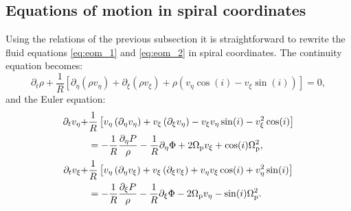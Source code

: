 \documentclass[useAMS,usenatbib]{mn2e}
\def\pa{\partial}
\begin{document}
\subsection{Equations of motion in spiral coordinates}
Using the relations of the previous subsection it is straightforward to rewrite the fluid equations \eqref{eq:eom_1} and \eqref{eq:eom_2} in spiral coordinates. The continuity equation becomes:
\begin{equation} 
	\pa_t \rho + \frac{1}{R}\left[ \pa_{\eta} \left(\rho v_{\eta}\right) + \pa_{\xi} \left(\rho v_{\xi}\right) + \rho \left(v_{\eta} \cos(i) - v_{\xi} \sin(i) \right)\right] = 0,
\label{eq:continuity}
\end{equation}
and the Euler equation:
\begin{align}
	\pa_t v_{\eta} + &\frac{1}{R} \left[ v_{\eta} \left(\pa_{\eta} v_{\eta}\right) + v_{\xi} \left(\pa_{\xi} v_{\eta}\right) - v_{\xi} v_{\eta} \sin(i) - v_{\xi}^2 \cos(i) \right] \nonumber \\
		& = - \frac{1}{R} \frac{ \pa_{\eta} P}{\rho} - \frac{1}{R} \pa_{\eta} \Phi + 2 \Omegap v_{\xi} +\cos(i) \Omegap^2, \\
	\pa_t v_{\xi}   + &\frac{1}{R} \left[ v_{\eta} \left(\pa_{\eta} v_{\xi}\right) + v_{\xi} \left(\pa_{\xi} v_{\xi}\right) + v_{\eta} v_{\xi} \cos(i) + v_{\eta}^2 \sin(i) \right] \nonumber \\ 
		& = - \frac{1}{R} \frac{ \pa_{\xi} P}{\rho} - \frac{1}{R} \pa_{\xi} \Phi - 2\Omegap v_{\eta} -\sin(i) \Omegap^2 .
\end{align}
\end{document}
